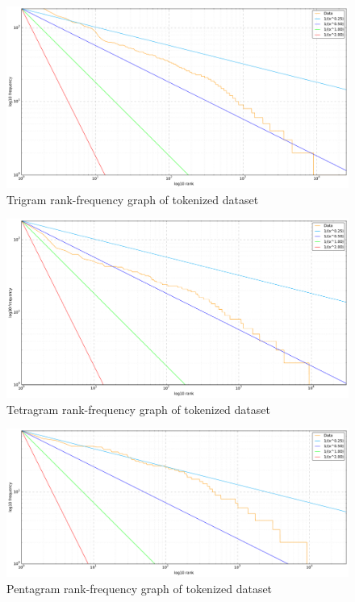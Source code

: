 \begin{figure}[ht]
	\centering
	\includegraphics[width=0.9\linewidth]{figures/frequency-graphs/3-gram}
	\caption{Trigram rank-frequency graph of tokenized dataset}
	\label{fig:rank-frequency-trigram}
\end{figure}

\begin{figure}[ht]
	\centering
	\includegraphics[width=0.9\linewidth]{figures/frequency-graphs/4-gram}
	\caption{Tetragram rank-frequency graph of tokenized dataset}
	\label{fig:rank-frequency-tetragram}
\end{figure}

\begin{figure}[ht]
	\centering
	\includegraphics[width=0.9\linewidth]{figures/frequency-graphs/5-gram}
	\caption{Pentagram rank-frequency graph of tokenized dataset}
	\label{fig:rank-frequency-pentagram}
\end{figure}



